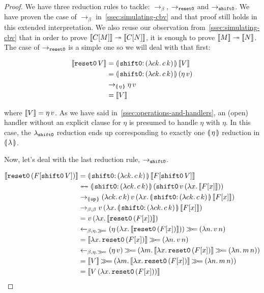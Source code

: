 \begin{proof}
We have three reduction rules to tackle: $\to_\beta$, $\to_{\mathtt{reset0}}$ and
$\to_{\mathtt{shift0}}$. We have proven the case of $\to_\beta$
in~\ref{ssec:simulating-cbv} and that proof still holds in this extended
interpretation. We also reuse our observation
from~\ref{ssec:simulating-cbv} that in order to prove $\llbracket C[M] \rrbracket \twoheadrightarrow
\llbracket C[N] \rrbracket$, it is enough to prove $\llbracket M \rrbracket \twoheadrightarrow \llbracket N \rrbracket$. The case of
$\to_{\mathtt{reset0}}$ is a simple one so we will deal with that first:

\begin{align}
  \sem{\ap{\reseto}{V}}
  &= \ap{\resetobanana}{\sem{V}} \\
  &= \ap{\resetobanana}{(\ap{\eta}{v})} \\
  &\to_{\banana{\eta}} \ap{\eta}{v} \\
  &= \sem{V}
\end{align}
\setcounter{equation}{0}

where $\llbracket V \rrbracket = \eta\,v$. As we have said
in~\ref{ssec:operations-and-handlers}, an (open) handler without an
explicit clause for $\eta$ is presumed to handle $\eta$ with $\eta$. In
this case, the $\lambda_{\mathtt{shift0}}$ reduction ends up corresponding to exactly
one $\llparenthesis \, \eta \, \rrparenthesis$ reduction in $\llparenthesis \, \lambda \, \rrparenthesis$.

Now, let's deal with the last reduction rule, $\to_{\mathtt{shift0}}$.

\begin{align}
  \sem{\ap{\reseto}{(F[\ap{\shifto}{V}])}}
  &= \ap{\resetobanana}{\sem{F[\ap{\shifto}{V}]}} \\
  &\ttoffrom \ap{\resetobanana}{(\app{\op{shift0}}{v}{(\lam{x}{\sem{F[x]}})})} \\
  &\to_{\banana{\op{op}}} \app{(\lam{c k}{\ap{c}{k}})}{v}{(\lam{x}{\ap{\resetobanana}{\sem{F[x]}}})} \\
  &\to_{\beta,\beta} \ap{v}{(\lam{x}{\ap{\resetobanana}{\sem{F[x]}}})} \\
  &= \ap{v}{(\lam{x}{\sem{\ap{\reseto}{(F[x])}}})} \\
  &\from_{\beta,\eta.\hsbind} (\ap{\eta}{(\lam{x}{\sem{\ap{\reseto}{(F[x])}}})}) \hsbind (\lam{n}{\ap{v}{n}}) \\
  &= \sem{\lam{x}{\ap{\reseto}{(F[x])}}} \hsbind (\lam{n}{\ap{v}{n}}) \\
  &\from_{\beta,\eta.\hsbind} (\ap{\eta}{v}) \hsbind (\lam{m}{\sem{\lam{x}{\ap{\reseto}{(F[x])}}} \hsbind (\lam{n}{\ap{m}{n}})}) \\
  &= \sem{V} \hsbind (\lam{m}{\sem{\lam{x}{\ap{\reseto}{(F[x])}}} \hsbind (\lam{n}{\ap{m}{n}})}) \\
  &= \sem{\ap{V}{(\lam{x}{\ap{\reseto}{(F[x])}})}}
\end{align}
\setcounter{equation}{0}


\end{proof}

